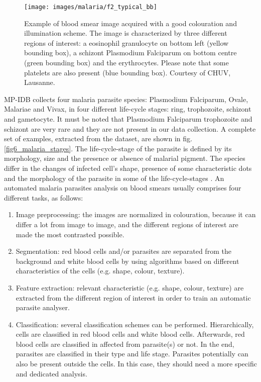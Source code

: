 \documentclass[final,a4paper,12pt,english]{UnicaPhdThesis3}
\begin{document}
\begin{figure}[!t]
	\centering	
	\texttt{[image: images/malaria/f2\_typical\_bb]}
	\caption{\label{fig4_colour} Example of blood smear image acquired with a good colouration and illumination scheme. The image is characterized by three different regions of interest: a eosinophil granulocyte on bottom left (yellow bounding box), a schizont Plasmodium Falciparum on bottom centre (green bounding box) and the erythrocytes. Please note that some platelets are also present (blue bounding box). Courtesy of CHUV, Lausanne.}
\end{figure}
MP-IDB collects four malaria parasite species: Plasmodium Falciparum, Ovale, Malariae and Vivax, in four different life-cycle stages: ring, trophozoite, schizont and gametocyte. It must be noted that Plasmodium Falciparum trophozoite and schizont are very rare and they are not present in our data collection. A complete set of examples, extracted from the dataset, are shown in fig. \ref{fig6_malaria_stages}. The life-cycle-stage of the parasite is defined by its morphology, size and the presence or absence of malarial pigment. The species differ in the changes of infected cell’s shape, presence of some characteristic dots and the morphology of the parasite in some of the life-cycle-stages \cite{Somasekar2011}.
An automated malaria parasites analysis on blood smears usually comprises four different tasks, as follows:
\begin{enumerate}  
	\item Image preprocessing: the images are normalized in colouration, because it can differ a lot from image to image, and the different regions of interest are made the most contrasted possible. 
	\item Segmentation: red blood cells and/or parasites are separated from the background and white blood cells by using algorithms based on different characteristics of the cells (e.g. shape, colour, texture).
	\item Feature extraction: relevant characteristic (e.g. shape, colour, texture) are extracted from the different region of interest in order to train an automatic parasite analyser.
	\item Classification: several classification schemes can be performed. Hierarchically, cells are classified in red blood cells and white blood cells. Afterwards, red blood cells are classified in affected from parasite(s) or not. In the end, parasites are classified in their type and life stage. Parasites potentially can also be present outside the cells. In this case, they should need a more specific and dedicated analysis.
\end{enumerate}
\end{document}

